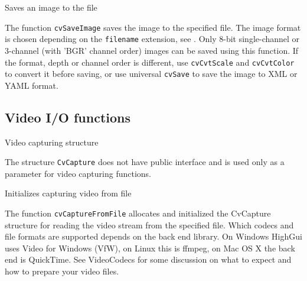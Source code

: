 
Saves an image to the file


\begin{description}
\end{description}

The function \texttt{cvSaveImage} saves the image to the specified file. The image format is chosen depending on the \texttt{filename} extension, see . Only 8-bit single-channel or 3-channel (with 'BGR' channel order) images can be saved using this function. If the format, depth or channel order is different, use \texttt{cvCvtScale} and \texttt{cvCvtColor} to convert it before saving, or use universal \texttt{cvSave} to save the image to XML or YAML format.

\subsection{Video I/O functions}


Video capturing structure


The structure \texttt{CvCapture} does not have public interface and is used only as a parameter for video capturing functions.


Initializes capturing video from file


\begin{description}
\end{description}

The function \texttt{cvCaptureFromFile} allocates and initialized the CvCapture structure for reading the video stream from the specified file. Which codecs and file formats are supported depends on the back end library. On Windows HighGui uses Video for Windows (VfW), on Linux this is ffmpeg, on Mac OS X the back end is QuickTime. See VideoCodecs for some discussion on what to expect and how to prepare your video files.

